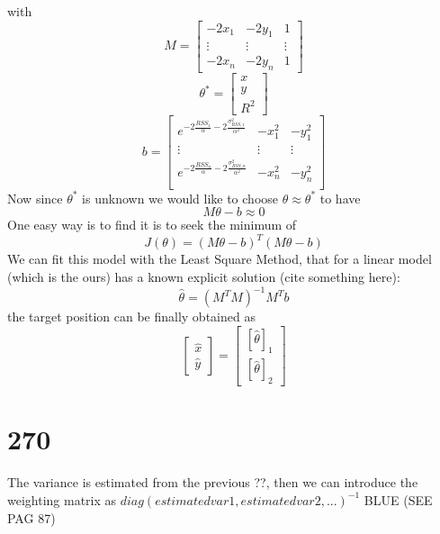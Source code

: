 \documentclass[12pt]{report}
\begin{document}
with $$M=\begin{bmatrix}
        -2x_1 & -2y_1 & 1\\
        \vdots&\vdots&\vdots\\
        -2x_n & -2y_n & 1
    \end{bmatrix}$$
$$\theta^* =     \begin{bmatrix}
        x\\
        y\\
        R^2
    \end{bmatrix}$$
$$b=    \begin{bmatrix}
        e^{-2\frac{RSS_1}{\alpha}-2\frac{\sigma^2_{RSS,1}}{\alpha^2}} & -x_1^2 & -y_1^2\\
        \vdots&\vdots&\vdots\\
        e^{-2\frac{RSS_n}{\alpha}-2\frac{\sigma^2_{RSS,n}}{\alpha^2}} & -x_n^2 & -y_n^2\\
    \end{bmatrix}$$
Now since $\theta^*$ is unknown we would like to choose $\theta\approx\theta^*$ to have 
\begin{equation}
    M\theta-b\approx0
\end{equation}
One easy way is to find it is to seek the minimum of 
\begin{equation}
    J(\theta)=(M\theta - b)^T(M\theta - b)
\end{equation}
We can fit this model with the Least Square Method, that for a linear model (which is the ours) has a known explicit solution (cite something here):
\begin{equation}
    \hat{\theta}=(M^TM)^{-1}M^Tb
\end{equation}
the target position can be finally obtained as 
\begin{equation}
\begin{bmatrix}
    \hat{x}\\
    \hat{y}
\end{bmatrix}=
\begin{bmatrix}
    [\hat{\theta}]_1\\
    [\hat{\theta}]_2
\end{bmatrix}
\end{equation}
\clearpage


\section{270}
The variance is estimated from the previous ??, then we can introduce the weighting matrix as $diag(estimated var1, estimated var 2,...)^{-1}$ BLUE (SEE PAG 87)
\clearpage
\end{document}
